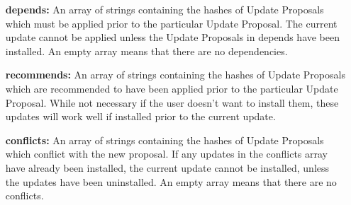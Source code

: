 \begin{itemize}
\item[\textbf{depends:}] An array of strings containing the hashes of Update Proposals which must be applied prior to the particular Update Proposal. The current update cannot be applied unless the Update Proposals in depends have been installed. An empty array means that there are no dependencies.

\item[\textbf{recommends:}] An array of strings containing the hashes of Update Proposals which are recommended to have been applied prior to the particular Update Proposal. While not necessary if the user doesn’t want to install them, these updates will work well if installed prior to the current update.

\item[\textbf{conflicts:}] An array of strings containing the hashes of Update Proposals which conflict with the new proposal. If any updates in the conflicts array have already been installed, the current update cannot be installed, unless the updates have been uninstalled. An empty array means that there are no conflicts.


\end{itemize}